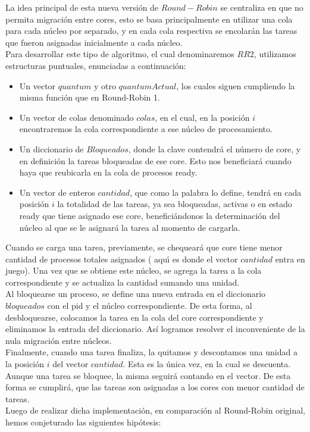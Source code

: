 La idea principal de esta nueva versi\'{o}n de $Round-Robin$ se centraliza en que no permita migraci\'{o}n entre
cores, esto se basa principalmente en utilizar una cola para cada núcleo por separado, y en cada
cola respectiva se encolar\'{a}n las tareas que fueron asignadas inicialmente a cada n\'ucleo.\\
Para desarrollar este tipo de algoritmo, el cual denominaremos $RR2$, utilizamos estructuras
puntuales, enunciadas a continuación:\\
\begin{itemize}
 \item Un vector $quantum$ y otro $quantumActual$, los cuales siguen cumpliendo la misma funci\'{o}n que
 en Round-Robin 1.
 \item Un vector de colas denominado $colas$, en el cual, en la posición $i$ encontraremos la cola correspondiente
 a ese núcleo de procesamiento.
 \item Un diccionario de $Bloqueados$, donde la clave contendr\'{a} el número de core, y en definición
 la tareas bloqueadas de ese core. Esto nos beneficiar\'{a} cuando haya que reubicarla en la cola de procesos ready.
 \item Un vector de enteros $cantidad$, que como la palabra lo define, tendrá en cada posición $i$ 
 la totalidad de las tareas, ya sea bloqueadas, activas o en estado ready que tiene asignado ese core, benefici\'{a}ndonos
 la determinación del núcleo al que se le asignará la tarea al momento de cargarla.
\end{itemize}
Cuando se carga una tarea, previamente, se chequeará que core tiene menor cantidad de procesos totales asignados (
aqu\'{\i} es donde el vector $cantidad$ entra en juego). Una vez que se obtiene este n\'{u}cleo, se agrega 
la tarea a la cola correspondiente y se actualiza la cantidad sumando una unidad.\\
\indent Al bloquearse un proceso, se define una nueva entrada en el diccionario $bloqueados$ con el
pid y el n\'{u}cleo correspondiente. De esta forma, al desbloquearse, colocamos la tarea en la cola del core
correspondiente y eliminamos la entrada del diccionario. Así logramos resolver el inconveniente de la nula
migración entre n\'{u}cleos.\\
\indent Finalmente, cuando una tarea finaliza, la quitamos y descontamos una unidad a la posición $i$ del vector
$cantidad$. Esta es la única vez, en la cual se descuenta. Aunque una tarea se bloquee, la misma
seguirá contando en el vector. De esta forma se cumplirá, que las tareas son asignadas a los cores
con menor cantidad de tareas.\\
Luego de realizar dicha implementación, en comparación al Round-Robin original, hemos conjeturado 
las siguientes hipótesis:

